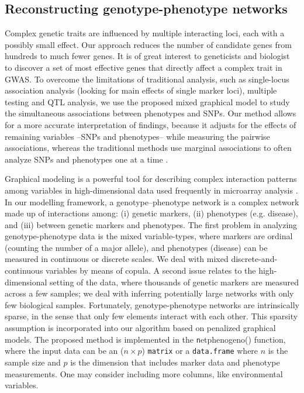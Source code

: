 \subsection{Reconstructing genotype-phenotype networks}
\label{QTL}
Complex genetic traits are influenced by multiple interacting loci, each with a possibly small effect. Our approach reduces the number of candidate genes from hundreds to much fewer genes. It is of great interest to geneticists and biologist to discover a set of most effective genes that directly affect a complex trait in GWAS. To overcome the limitations of traditional analysis, such as single-locus association analysis (looking for main effects of single marker loci), multiple testing and QTL analysis, we use the proposed mixed graphical model to study the simultaneous associations between phenotypes and SNPs. Our method allows for a more accurate interpretation of findings, because it adjusts for the effects of remaining variables --SNPs and phenotypes-- while measuring the pairwise associations, whereas the traditional methods use marginal associations to often analyze SNPs and phenotypes one at a time .

Graphical modeling is a powerful tool for describing complex interaction patterns  among variables in high-dimensional data used frequently in microarray analysis \citep{butte2000discovering}. %
In our modelling framework, a ge\-no\-type--phenotype network is a complex network made up of interactions among: (i) genetic markers, (ii) phenotypes (e.g. disease), and (iii) between genetic markers and phenotypes. The first problem in analyzing genotype-phenotype data is the mixed variable-types, where markers are ordinal (counting the number of a major allele), and phenotypes (disease) can be measured in continuous or discrete scales. We deal with mixed  discrete-and-continuous variables by means of copula. A second issue relates to the high-dimensional setting of the data, where thousands of genetic markers are measured across a few samples; we deal with inferring potentially large networks with only few biological samples. Fortunately, genotype-phenotype networks are intrinsically sparse, in the sense that only few elements interact with each other. This sparsity assumption is incorporated into our algorithm based on penalized graphical models. The proposed method is implemented in the  {\texttt netphenogeno()} function, where the input data can be an ($n \times p$) {\tt matrix} or a {\tt data.frame} where $n$ is the sample size and $p$ is the dimension that includes marker data and phenotype measurements. One may consider including more columns, like environmental variables. 

